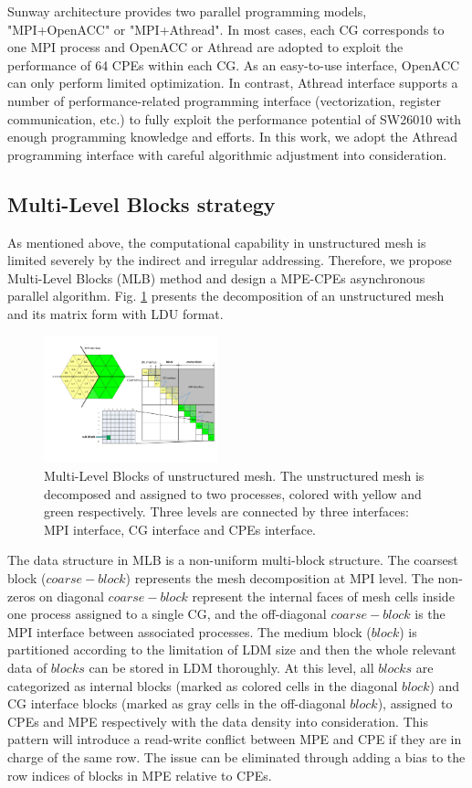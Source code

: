 \documentclass[5p,times]{elsarticle}
\begin{document}
Sunway architecture provides two parallel programming models, "MPI+OpenACC" or "MPI+Athread". In most cases, each CG corresponds to one MPI process and OpenACC or Athread are adopted to exploit the performance of 64 CPEs within each CG. As an easy-to-use interface, OpenACC can only perform limited optimization. In contrast, Athread interface supports a number of performance-related programming interface (vectorization, register communication, etc.) to fully exploit the performance potential of SW26010 with enough programming knowledge and efforts. In this work, we adopt the Athread programming interface with careful algorithmic adjustment into consideration.

\subsection{Multi-Level Blocks strategy}

As mentioned above, the computational capability in unstructured mesh is limited severely by the indirect and irregular addressing. Therefore, we propose Multi-Level Blocks (MLB) method and design a MPE-CPEs asynchronous parallel algorithm. Fig. \ref{mlb(overview)} presents the decomposition of an unstructured mesh and its matrix form with LDU format.
\begin{figure}[tbp]
\centerline{\includegraphics[width=0.45\textwidth]{mlb(overview).pdf}}
\caption{Multi-Level Blocks of unstructured mesh. The unstructured mesh is decomposed and assigned to two processes, colored with yellow and green respectively. Three levels are connected by three interfaces: MPI interface, CG interface and CPEs interface.}
\label{mlb(overview)}
\end{figure}
The data structure in MLB is a non-uniform multi-block structure. The coarsest block ($coarse-block$) represents the mesh decomposition at MPI level. The non-zeros on diagonal $coarse-block$ represent the internal faces of mesh cells inside one process assigned to a single CG, and the off-diagonal $coarse-block$ is the MPI interface between associated processes. The medium block ($block$) is partitioned according to the limitation of LDM size and then the whole relevant data of $blocks$ can be stored in LDM thoroughly. At this level, all $blocks$ are categorized as internal blocks (marked as colored cells in the diagonal $block$) and CG interface blocks (marked as gray cells in the off-diagonal $block$), assigned to CPEs and MPE respectively with the data density into consideration. This pattern will introduce a read-write conflict between MPE and CPE if they are in charge of the same row. The issue can be eliminated through adding a bias to the row indices of blocks in MPE relative to CPEs.
\end{document}
